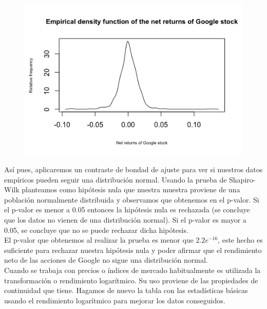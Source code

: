 \documentclass[a4paper,]{article}
\begin{document}
\begin{figure}[h!]
    \centering
    \includegraphics[scale=0.65]{Rplot1.png}
\end{figure}

Así pues, aplicaremos un contraste de bondad de ajuste para ver si nuestros datos empíricos pueden seguir una distribución normal. Usando la prueba de Shapiro-Wilk planteamos como hipótesis nula que nuestra muestra proviene de una población normalmente distribuida y observamos que obtenemos en el p-valor. Si el p-valor es menor a 0.05 entonces la hipótesis nula es rechazada (se concluye que los datos no vienen de una distribución normal). Si el p-valor es mayor a 0.05, se concluye que no se puede rechazar dicha hipótesis.\\

El p-valor que obtenemos al realizar la prueba es menor que $2.2e^{-16}$, este hecho es suficiente para rechazar nuestra hipótesis nula y poder afirmar que el rendimiento neto de las acciones de Google no sigue una distribución normal.  \\

Cuando se trabaja con precios o índices de mercado habitualmente es utilizada la transformación o rendimiento logarítmico. Su uso proviene de las propiedades de continuidad que tiene. Hagamos de nuevo la tabla con las estadísticas básicas usando el rendimiento logarítmico para mejorar los datos conseguidos.
\end{document}
